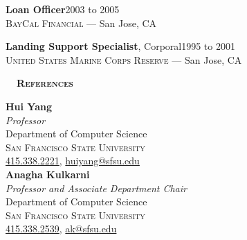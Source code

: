 \documentclass[hidelinks, 10pt]{article}
\def\contentwidth{0.9\linewidth}    %
\def\contentblockspacing{2.5mm}     %
\def\sectionspacing{8mm}            %
\def\sectiontocontentspacing{4mm}   %
\renewcommand{\section}[1]{
    {\fontsize{14}{14}\selectfont \textsc{\textbf{\ \ #1\ \ }}}\hrulefill
}
\begin{document}
{\vspace{\contentblockspacing}

\begin{minipage}[ct]{\contentwidth}
    \textbf{Loan Officer}\hfill 2003 to 2005\\
    {\textsc{BayCal Financial} --- San Jose, CA}
\end{minipage}



\vspace{\contentblockspacing}

\begin{minipage}[ct]{\contentwidth}
    \textbf{Landing Support Specialist}, Corporal\hfill 1995 to 2001\\
    {\textsc{United States Marine Corps Reserve} --- San Jose, CA}
\end{minipage}

\vspace{\sectionspacing}
\pagebreak

\section{References}

\vspace{\sectiontocontentspacing}

\begin{minipage}[ct]{\contentwidth}
    \begin{multicols}{2}
        \textbf{Hui Yang}\\
        \emph{Professor}\\
        {Department of Computer Science}\\
        \textsc{San Francisco State University}\\
        \href{tel:4153382221}{415.338.2221}, \href{mailto:huiyang@sfsu.edu}{huiyang@sfsu.edu}\\

        \textbf{Anagha Kulkarni}\\
        \emph{Professor and Associate Department Chair}\\
        {Department of Computer Science}\\
        \textsc{San Francisco State University}\\
        \href{tel:4153382539}{415.338.2539}, \href{mailto:ak@sfsu.edu}{ak@sfsu.edu}\\
    \end{multicols}
\end{minipage}

}
\end{document}
